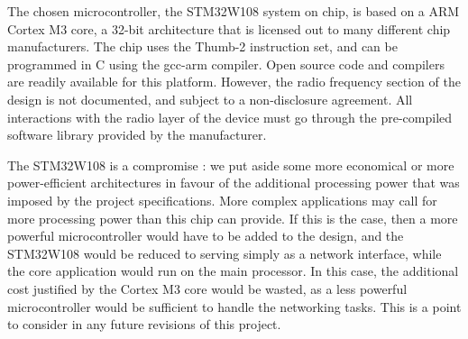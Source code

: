 The chosen microcontroller, the STM32W108 system on chip, is based on a ARM
Cortex M3 core, a 32-bit architecture that is licensed out to many different
chip manufacturers. The chip uses the Thumb-2 instruction set, and can be
programmed in C using the gcc-arm compiler. Open source code and compilers are
readily available for this platform. However, the radio frequency section of the
design is not documented, and subject to a non-disclosure agreement. All
interactions with the radio layer of the device must go through the pre-compiled
software library provided by the manufacturer.

The STM32W108 is a compromise : we put aside some more economical or more
power-efficient architectures in favour of the additional processing power that
was imposed by the project specifications.
More complex applications may call for more processing power than this chip can
provide. If this is the case, then a more powerful microcontroller would have to
be added to the design, and the STM32W108 would be reduced to serving simply as
a network interface, while the core application would run on the main processor.
In this case, the additional cost justified by the Cortex M3 core would be
wasted, as a less powerful microcontroller would be sufficient to handle the
networking tasks. This is a point to consider in any future revisions of this
project.
